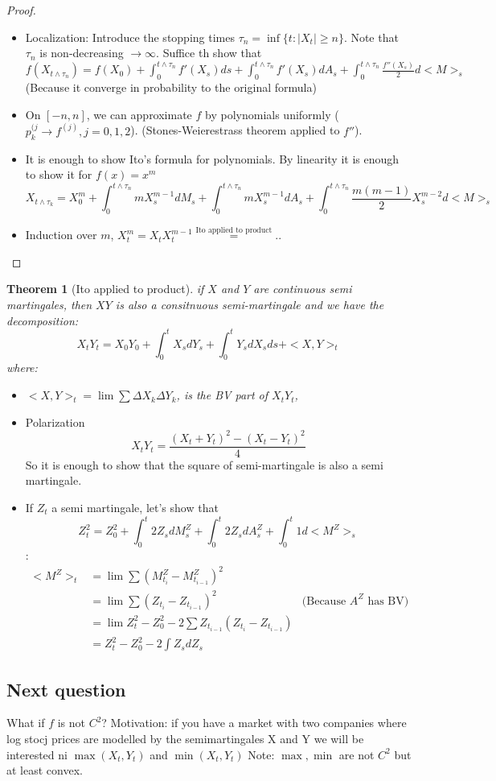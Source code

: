 \documentclass{article}
\newtheorem{theorem}{Theorem}
\begin{document}
\begin{proof}
  $ $\newline
\begin{itemize}
\item Localization:
  Introduce the stopping times $\tau_n = \inf \{ t: |X_t| \ge n\}$. Note that $\tau_n$ is non-decreasing $\rightarrow \infty$.
  Suffice th show that $f(X_{t \wedge \tau_n}) = f(X_0) + \int_0^{t \wedge \tau_n} f'(X_s)ds + \int_0^{t \wedge \tau_n} f'(X_s)dA_s + \int_0^{t \wedge \tau_n} \frac{f''(X_s)}2 d<M>_s$ (Because it converge in probability to the original formula)
\item On $[-n, n]$, we can approximate $f$ by polynomials uniformly ($p_k^{(j} \rightarrow f^{(j)}, j = 0, 1, 2$). (Stones-Weierestrass theorem applied to $f''$). 
\item It is enough to show Ito's formula for polynomials. By linearity it is enough to show it for $f(x) = x^m$
  $$X_{t \wedge \tau_k} = X_0^m + \int_0^{t \wedge \tau_n} mX_s^{m-1} dM_s + \int_0^{t \wedge \tau_n} m X_s^{m-1} dA_s + \int_0^{t \wedge \tau_n} \frac{m(m-1)}2 X_s^{m-2} d<M>_s$$
\item Induction over $m$, $X_t^m = X_t X_t^{m-1} \overset{\text{Ito applied to product}}{=} ..$
\end{itemize}
\end{proof}

\begin{theorem}[Ito applied to product]
  if $X$ and $Y$ are continuous semi martingales, then $XY$ is also a consitnuous semi-martingale and we have the decomposition:
  $$X_t Y_t = X_0 Y_0 + \int_0^t X_s dY_s + \int_0^t Y_s dX_sds + <X, Y>_t$$ where:
  \begin{itemize}
  \item $<X, Y>_t = \lim \sum \Delta X_k \Delta Y_k$, is the BV part of $X_t Y_t$, 
  \end{itemize}
\end{theorem}


\begin{itemize}
\item Polarization $$X_tY_t = \frac{(X_t + Y_t)^2 - (X_t - Y_t)^2}4$$
  So it is enough to show that the square of semi-martingale is also a
  semi martingale.
\item If $Z_t$ a semi martingale, let's show that $$Z_t^2 = Z_0^2 + \int_0^t2Z_s dM_s^Z + \int_0^t 2 Z_s dA_s^Z + \int_0^t 1 d<M^Z>_s$$:
  \begin{align*}
    <M^Z>_t &= \lim \sum (M^Z_{t_i} - M^Z_{t_{i-1}})^2
    \\&= \lim \sum (Z_{t_i} - Z_{t_{i-1}})^2 & \text{(Because $A^Z$ has BV)}
    \\&= \lim Z_t^2 - Z_0^2 -2 \sum Z_{t_{i-1}}(Z_{t_i} - Z_{t_{i-1}})
    \\&= Z_t^2 - Z_0^2 -2 \int Z_s dZ_s
  \end{align*}
\end{itemize}


\subsection{Next question}
What if $f$ is not $C^2$?
Motivation: if you have a market with two companies where log stocj prices are modelled by the semimartingales X and Y we will be interested ni
$\max(X_t, Y_t)$ and $\min(X_t, Y_t)$
Note: $\max, \min$ are not $C^2$ but at least convex.
\end{document}

